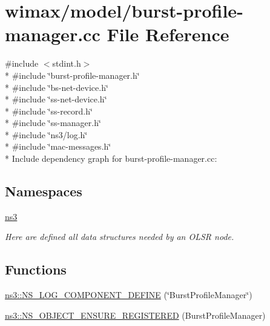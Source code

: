 \hypertarget{burst-profile-manager_8cc}{}\section{wimax/model/burst-\/profile-\/manager.cc File Reference}
\label{burst-profile-manager_8cc}
{\ttfamily \#include $<$stdint.\+h$>$}\\*
{\ttfamily \#include \char`\"{}burst-\/profile-\/manager.\+h\char`\"{}}\\*
{\ttfamily \#include \char`\"{}bs-\/net-\/device.\+h\char`\"{}}\\*
{\ttfamily \#include \char`\"{}ss-\/net-\/device.\+h\char`\"{}}\\*
{\ttfamily \#include \char`\"{}ss-\/record.\+h\char`\"{}}\\*
{\ttfamily \#include \char`\"{}ss-\/manager.\+h\char`\"{}}\\*
{\ttfamily \#include \char`\"{}ns3/log.\+h\char`\"{}}\\*
{\ttfamily \#include \char`\"{}mac-\/messages.\+h\char`\"{}}\\*
Include dependency graph for burst-\/profile-\/manager.cc\+:
\subsection*{Namespaces}
\begin{DoxyCompactItemize}
\item 
 \hyperlink{namespacens3}{ns3}
\begin{DoxyCompactList}\small\item\em Here are defined all data structures needed by an O\+L\+SR node. \end{DoxyCompactList}\end{DoxyCompactItemize}
\subsection*{Functions}
\begin{DoxyCompactItemize}
\item 
\hyperlink{namespacens3_a02aa426ca49293054ed1c82669daf813}{ns3\+::\+N\+S\+\_\+\+L\+O\+G\+\_\+\+C\+O\+M\+P\+O\+N\+E\+N\+T\+\_\+\+D\+E\+F\+I\+NE} (\char`\"{}Burst\+Profile\+Manager\char`\"{})
\item 
\hyperlink{namespacens3_afbe99245b248306c45f824694813b200}{ns3\+::\+N\+S\+\_\+\+O\+B\+J\+E\+C\+T\+\_\+\+E\+N\+S\+U\+R\+E\+\_\+\+R\+E\+G\+I\+S\+T\+E\+R\+ED} (Burst\+Profile\+Manager)
\end{DoxyCompactItemize}
